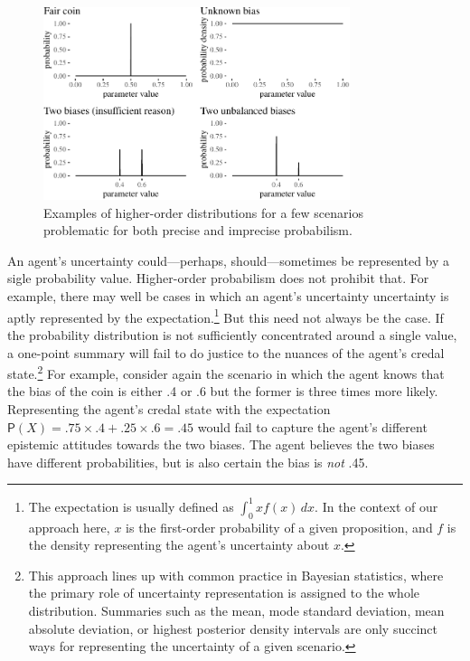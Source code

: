 \documentclass[
  letterpaper,
  DIV=11,
  numbers=noendperiod]{scrartcl}
\begin{document}
\begin{figure}[t]

{\centering \includegraphics[width=0.8\textwidth,height=\textheight]{imp_philosophical_backup_files/figure-pdf/fig-evidenceResponse-1.pdf}

}

\caption{\label{fig-evidenceResponse}Examples of higher-order
distributions for a few scenarios problematic for both precise and
imprecise probabilism.}

\end{figure}

An agent's uncertainty could---perhaps, should---sometimes be
represented by a sigle probability value. Higher-order probabilism does
not prohibit that. For example, there may well be cases in which an
agent's uncertainty uncertainty is aptly represented by the
expectation.\footnote{The expectation is usually defined as
  \(\int_{0}^{1} x f(x) \, dx\). In the context of our approach here,
  \(x\) is the first-order probability of a given proposition, and \(f\)
  is the density representing the agent's uncertainty about \(x\).} But
this need not always be the case. If the probability distribution is not
sufficiently concentrated around a single value, a one-point summary
will fail to do justice to the nuances of the agent's credal
state.\footnote{This approach lines up with common practice in Bayesian
  statistics, where the primary role of uncertainty representation is
  assigned to the whole distribution. Summaries such as the mean, mode
  standard deviation, mean absolute deviation, or highest posterior
  density intervals are only succinct ways for representing the
  uncertainty of a given scenario.} For example, consider again the
scenario in which the agent knows that the bias of the coin is either .4
or .6 but the former is three times more likely. Representing the
agent's credal state with the expectation
\(\mathsf{P}(X) = .75 \times .4 + .25 \times .6 = .45\) would fail to
capture the agent's different epistemic attitudes towards the two
biases. The agent believes the two biases have different probabilities,
but is also certain the bias is \emph{not} .45.
\end{document}
